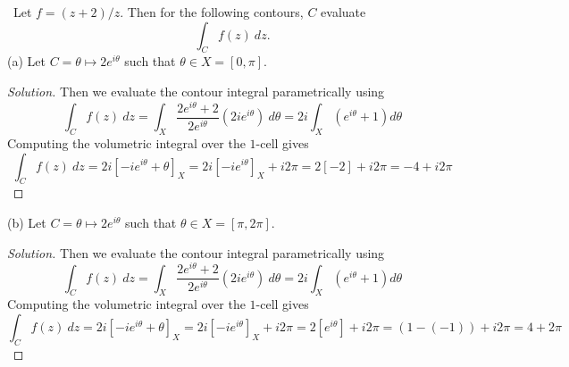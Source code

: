 \documentclass[11pt]{amsart}
\theoremstyle{definition}
\numberwithin{theorem}{section}
\numberwithin{definition}{section}
\numberwithin{equation}{section}
\newenvironment{solution}
  {\begin{proof}[Solution]}
  {\end{proof}}
\begin{document}
\medskip {}\ Let $f = (z+2)/z$. Then for the following contours, $C$ evaluate \begin{equation*}
\int_C f(z)\ dz.
\end{equation*}
\noindent (a) Let $C = \theta \mapsto 2e^{i\theta}$ such that $\theta \in X = [0, \pi].$
\begin{solution}
	Then we evaluate the contour integral parametrically using
	\begin{equation*}
		\int_C f(z)\ dz = \int_X \frac{2e^{i\theta} + 2}{2e^{i\theta}}\left(2ie^{i\theta}\right)\ d\theta
		= 2i\int_X \left(e^{i\theta} + 1\right) d\theta
	\end{equation*}
	Computing the volumetric integral over the $1$-cell gives
	\begin{equation*}
		\int_C f(z)\ dz = 2i\left[-ie^{i\theta} + \theta\right]_X =2i\left[-ie^{i\theta} \right]_X + i2\pi
		=2\left[-2 \right] + i2\pi = -4 + i2\pi
	\end{equation*}
\end{solution}

\noindent (b) Let $C = \theta \mapsto 2e^{i\theta}$ such that $\theta \in X = [\pi, 2\pi].$
\begin{solution}
	Then we evaluate the contour integral parametrically using
	\begin{equation*}
		\int_C f(z)\ dz = \int_X \frac{2e^{i\theta} + 2}{2e^{i\theta}}\left(2ie^{i\theta}\right)\ d\theta
		= 2i\int_X \left(e^{i\theta} + 1\right) d\theta
	\end{equation*}
	Computing the volumetric integral over the $1$-cell gives
	\begin{equation*}
		\int_C f(z)\ dz = 2i\left[-ie^{i\theta} + \theta\right]_X =2i\left[-ie^{i\theta} \right]_X + i2\pi
		=2\left[e^{i\theta}\right] + i2\pi = (1 - (-1)) + i2\pi = 4 + 2\pi
	\end{equation*}
\end{solution}
\end{document}

